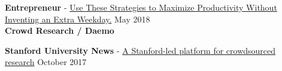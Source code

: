 \textbf{Entrepreneur} - \href{https://www.entrepreneur.com/article/312764}{Use These Strategies to Maximize Productivity Without Inventing an Extra Weekday.} \hfill May 2018\\









\textcolor{sectcol}{\textbf{Crowd Research / Daemo}}

\textbf{Stanford University News} - \href{https://news.stanford.edu/2017/10/23/crowdsourced-research-gives-experience-global-participants/}{A Stanford-led platform for crowdsourced research} \hfill October 2017


